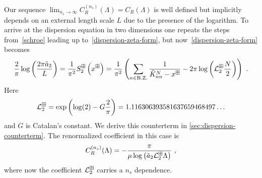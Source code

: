 Our sequence $\lim_{n_s\to\infty}C^{(n_s)}_R(\Lambda) = C_R(\Lambda)$ is well defined but implicitly depends on an external length scale $L$ due to the presence of the logarithm.  To arrive at the dispersion equation in two dimensions one repeats the steps from~\eqref{schroe} leading up to~\eqref{dispersion-zeta-form}, but now~\eqref{dispersion-zeta-form} becomes
\begin{equation}
    \frac{2}{\pi} \log \left(\frac{2\pi \tilde a_{2}}{L}\right)=\frac{1}{\pi^2}S^{\boxplus}_2\left(x^\boxplus\right)
    =
    \frac{1}{\pi^2}
    \left(
        \sum_{n\in\operatorname{B.Z.}}\frac{1}{\tilde{K}^N_{nn}-x^\boxplus}
        -2\pi \log \left(\mathcal{L}^\boxplus_2\frac{N}{2}\right)
    \right)\ .
\end{equation}
Here
\begin{equation}
    \mathcal{L}^\boxplus_{2}
    =
    \exp \left(\log (2)-G \frac{2}{\pi}\right)
    =
    1.116306393581637659468497 \ldots
\end{equation}
and $G$ is Catalan's constant.  We derive this counterterm in \ref{sec:dispersion-counterterm}.  The renormalized coefficient in this case is
\begin{equation}\label{eq:C2-dispersion}
C^{(n_s)}_R(\Lambda)=-\frac{ \pi}{\mu \log \left(\tilde a_{2} \mathcal{L}^\boxplus_2\Lambda\right)}\ ,
\end{equation}
where now the coefficient $\mathcal{L}_2^\boxplus$ carries a $n_s$ dependence.
